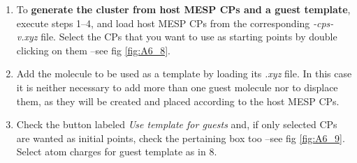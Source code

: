 \documentclass[10pt]{article}
\begin{document}
\begin{enumerate}
\item To {\bf generate the cluster from host MESP CPs and a guest template}, 
execute steps 1--4, and load host MESP CPs from the corresponding
{\it *-cps-v.xyz} file. Select the CPs that you want to use as starting points
by double clicking on them --see fig \ref{fig:A6_8}.

\item Add the molecule to be used as a template by loading its
{\it *.xyz} file. In this case it is neither necessary to add more than one
guest molecule nor to displace them,
as they will be created and placed according to the host MESP CPs.

\item Check the button labeled {\it Use template for guests} and, if
only selected CPs are wanted as initial points, check the pertaining box too
--see fig \ref{fig:A6_9}. Select atom charges for guest template as in 8.


\end{enumerate}
\end{document}
